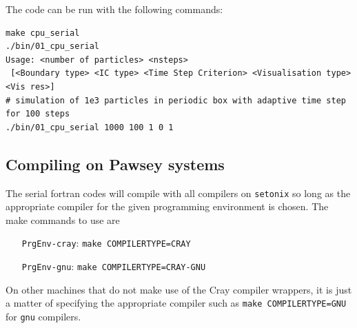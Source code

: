 \par 
The code can be run with the following commands: 
\begin{center}
\begin{minipage}{0.95\textwidth}
\small
\begin{verbatim}
make cpu_serial
./bin/01_cpu_serial 
Usage: <number of particles> <nsteps>
 [<Boundary type> <IC type> <Time Step Criterion> <Visualisation type> <Vis res>]
# simulation of 1e3 particles in periodic box with adaptive time step for 100 steps  
./bin/01_cpu_serial 1000 100 1 0 1  
\end{verbatim}
\end{minipage}
\end{center}

\subsection{Compiling on Pawsey systems}
The serial fortran codes will compile with all compilers on \texttt{setonix} so long as the appropriate compiler for the given programming environment is chosen. The make commands to use are 
\begin{itemize}
    \setlength{\itemindent}{70pt}
    \item[\texttt{PrgEnv-cray}:\quad]{\texttt{make COMPILERTYPE=CRAY}}
    \item[\texttt{PrgEnv-gnu}:\quad]{\texttt{make COMPILERTYPE=CRAY-GNU}}
\end{itemize}
On other machines that do not make use of the Cray compiler wrappers, it is just a matter of specifying the appropriate compiler such as \texttt{make COMPILERTYPE=GNU} for \texttt{gnu} compilers.

